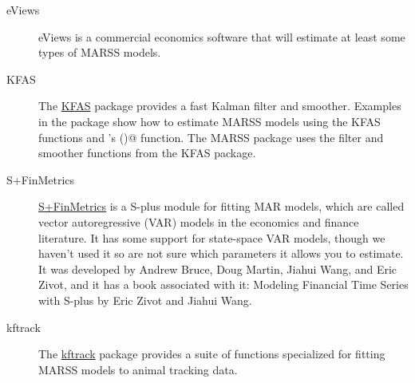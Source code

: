 \begin{description}
	\item[eViews] eViews is a commercial economics software that will estimate at least some types of MARSS models.
	\item[KFAS] The \href{https://cran.r-project.org/package=KFAS}{KFAS} \R package provides a fast Kalman filter and smoother.  Examples in the package show how to estimate MARSS models using the KFAS functions and \R's \verb@optim()@ function.   The MARSS package uses the filter and smoother functions from the KFAS package.
		\item[S+FinMetrics] \href{http://faculty.washington.edu/ezivot/MFTS2ndEditionFinMetrics.htm}{S+FinMetrics} is a S-plus module for fitting MAR models, which are called vector autoregressive (VAR) models in the economics and finance literature.  It has some support for state-space VAR models, though we haven't used it so are not sure which parameters it allows you to estimate.  It was developed by Andrew Bruce, Doug Martin, Jiahui Wang, and Eric Zivot, and it has a book associated with it: Modeling Financial Time Series with S-plus by Eric Zivot and Jiahui Wang.
		\item[kftrack] The \href{https://github.com/positioning/kalmanfilter/wiki}{kftrack} \R package provides a suite of functions specialized for fitting MARSS models to animal tracking data.
\end{description}